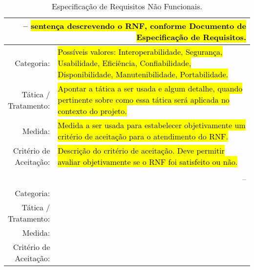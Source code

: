 \begin{footnotesize}
\begin{longtable}{|r|p{13cm}|}
	\caption{Especificação de Requisitos Não Funcionais.}
	\label{tabela-rnfs}\\\hline
	
	\multicolumn{2}{|p{\dimexpr\linewidth-2\tabcolsep-2\arrayrulewidth}|}{\cellcolor{lightgray}\RNF\label{rnf-definir-label01} -- \hl{sentença descrevendo o RNF, conforme Documento de Especificação de Requisitos.}}\\\hline
	
	Categoria: & \hl{Possíveis valores: Interoperabilidade, Segurança, Usabilidade, Eficiência, Confiabilidade, Disponibilidade, Manutenibilidade, Portabilidade.} \\\hline
	
	\parbox[t]{2cm}{\raggedleft Tática /\\Tratamento:} & \hl{Apontar a tática a ser usada e algum detalhe, quando pertinente sobre como essa tática será aplicada no contexto do projeto.} \\\hline
	
	Medida: & \hl{Medida a ser usada para estabelecer objetivamente um critério de aceitação para o atendimento do RNF.} \\\hline
	
	\parbox[t]{2cm}{\raggedleft Critério de\\Aceitação:} & \hl{Descrição do critério de aceitação. Deve permitir avaliar objetivamente se o RNF foi satisfeito ou não.} \\\hline

	
	\\\hline

	
	\\\hline
	
	Categoria: &  \\\hline
	
	\parbox[t]{2cm}{\raggedleft Tática /\\Tratamento:} &  \\\hline
	
	Medida: &  \\\hline
	
	\parbox[t]{2cm}{\raggedleft Critério de\\Aceitação:} &  \\\hline

\end{longtable}
\end{footnotesize}
